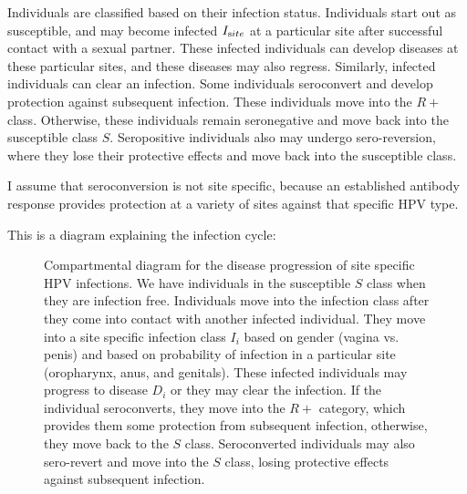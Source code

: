 \documentclass[12pt]{article}
\begin{document}
Individuals are classified based on their infection status.  Individuals start out as susceptible, and may become infected $I_{\text site}$ at a particular site after successful contact with a sexual partner.  These infected individuals can develop diseases at these particular sites, and these diseases may also regress.  Similarly, infected individuals can clear an infection.  Some individuals seroconvert and develop protection against subsequent infection.  These individuals move into the $R+$ class.  Otherwise, these individuals remain seronegative and move back into the susceptible class $S$. Seropositive individuals also may undergo sero-reversion, where they lose their protective effects and move back into the susceptible class.  

I assume that seroconversion is not site specific, because an established antibody response provides protection at a variety of sites against that specific HPV type.  

This is a diagram explaining the infection cycle:
\begin{figure}[h!]
\begin{center}
\end{center}
\caption{Compartmental diagram for the disease progression of site specific HPV infections.  We have individuals in the susceptible $S$ class when they are infection free.  Individuals move into the infection class after they come into contact with another infected individual.  They move into a site specific infection class $I_i$ based on gender (vagina vs. penis) and based on probability of infection in a particular site (oropharynx, anus, and genitals).   These infected individuals may progress to disease $D_i$ or they may clear the infection.  If the individual seroconverts, they move into the $R+$ category, which provides them some protection from subsequent infection, otherwise, they move back to the $S$ class.  Seroconverted individuals may also sero-revert and move into the $S$ class, losing protective effects against subsequent infection.  }
\end{figure}
\end{document}

